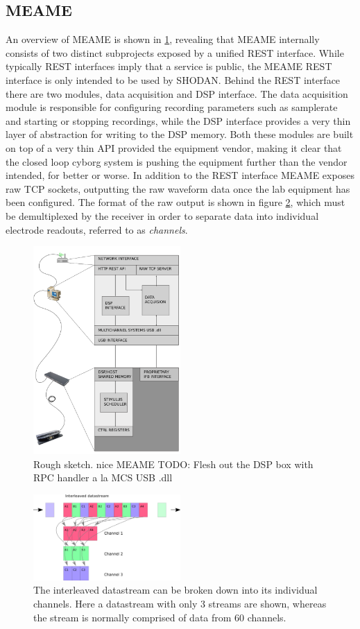 \subsection{MEAME}
An overview of MEAME is shown in \ref{figMEAME}, revealing that MEAME internally
consists of two distinct subprojects exposed by a unified REST interface.
While typically REST interfaces imply that a service is public, the MEAME REST
interface is only intended to be used by SHODAN.
%
Behind the REST interface there are two modules, data acquisition and DSP interface.
%
The data acquisition module is responsible for configuring recording parameters
such as samplerate and starting or stopping recordings, while the DSP interface
provides a very thin layer of abstraction for writing to the DSP memory.
%
Both these modules are built on top of a very thin API provided the equipment
vendor, making it clear that the closed loop cyborg system is pushing the
equipment further than the vendor intended, for better or worse.
%
In addition to the REST interface MEAME exposes raw TCP sockets, outputting the
raw waveform data once the lab equipment has been configured.
%
The format of the raw output is shown in figure \ref{figLayout}, which must be
demultiplexed by the receiver in order to separate data into individual
electrode readouts, referred to as \emph{channels}.
%
\begin{figure}[h!]
  \centering
  \includegraphics[width=0.5\textwidth]{fig/MEAME.png}
  \caption{Rough sketch.
    nice MEAME
    TODO: Flesh out the DSP box with RPC handler a la MCS USB .dll
  }
  \label{figMEAME}
\end{figure}
\begin{figure}[h!]
  \centering
  \includegraphics[width=0.5\textwidth]{fig/reorder.png}
  \caption{
    The interleaved datastream can be broken down into its individual channels.
    Here a datastream with only 3 streams are shown, whereas the stream is
    normally comprised of data from 60 channels.
  }
  \label{figLayout}
\end{figure}
